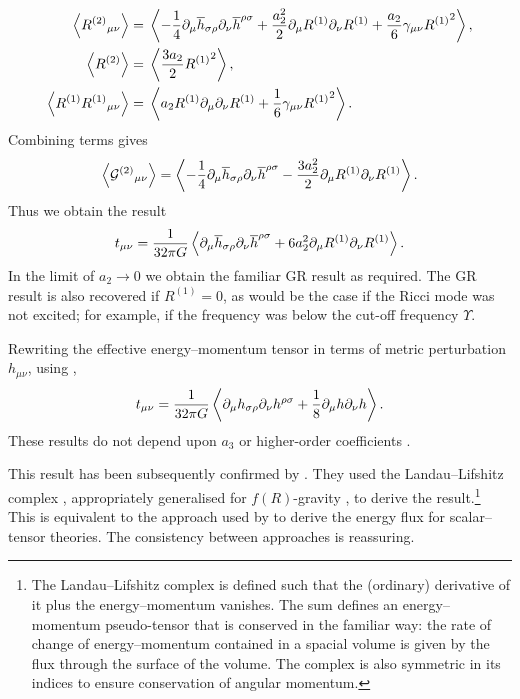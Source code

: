 \begin{subequations}
\begin{align}
\left\langle {R^{(2)}}_{\mu\nu} \right\rangle = {} & \left\langle -\dfrac{1}{4} \partial_\mu\overline{h}_{\sigma\rho}\partial_\nu\overline{h}^{\rho\sigma} + \dfrac{a_2^2}{2}\partial_\mu R^{(1)}\partial_\nu R^{(1)} + \dfrac{a_2}{6}\gamma_{\mu\nu} {R^{(1)}}^2 \right\rangle, \\
\left\langle R^{(2)} \right\rangle = {} & \left\langle \dfrac{3a_2}{2}{R^{(1)}}^2 \right\rangle, \\
\left\langle R^{(1)}{R^{(1)}}_{\mu\nu} \right\rangle = {} & \left\langle a_2 R^{(1)} \partial_\mu\partial_\nu R^{(1)} + \dfrac{1}{6}\gamma_{\mu\nu}{R^{(1)}}^2\right\rangle.
\end{align}
\end{subequations}
Combining terms gives
\begin{equation}
\left\langle {\mathcal{G}^{(2)}}_{\mu\nu}\right\rangle = \left\langle -\dfrac{1}{4} \partial_\mu\overline{h}_{\sigma\rho}\partial_\nu\overline{h}^{\rho\sigma} - \dfrac{3a_2^2}{2}\partial_\mu R^{(1)}\partial_\nu R^{(1)} \right\rangle.
\end{equation}
Thus we obtain the result
\begin{equation}
t_{\mu\nu} = \dfrac{1}{32\pi G}\left\langle \partial_\mu\overline{h}_{\sigma\rho}\partial_\nu\overline{h}^{\rho\sigma} + 6a_2^2\partial_\mu R^{(1)}\partial_\nu R^{(1)} \right\rangle.
\label{eq:Pseudotensor}
\end{equation}
In the limit of $a_2 \rightarrow 0$ we obtain the familiar GR result as required. The GR result is also recovered if $R^{(1)} = 0$, as would be the case if the Ricci mode was not excited; for example, if the frequency was below the cut-off frequency $\Upsilon$.

Rewriting the effective energy--momentum tensor in terms of metric perturbation $h_{\mu\nu}$, using ,
\begin{equation}
t_{\mu\nu} = \dfrac{1}{32\pi G}\left\langle \partial_\mu h_{\sigma\rho}\partial_\nu h^{\rho\sigma} + \dfrac{1}{8}\partial_\mu h \partial_\nu h \right\rangle.
\end{equation}
These results do not depend upon $a_3$ or higher-order coefficients \citep{Stein2011}.

This result has been subsequently confirmed by \citet{Naf2011}. They used the Landau--Lifshitz complex \citep[section 94]{Landau1975}, appropriately generalised for $f(R)$-gravity \citep{Nutku1969}, to derive the result.\footnote{The Landau--Lifshitz complex is defined such that the (ordinary) derivative of it plus the energy--momentum vanishes. The sum defines an energy--momentum pseudo-tensor that is conserved in the familiar way: the rate of change of energy--momentum contained in a spacial volume is given by the flux through the surface of the volume. The complex is also symmetric in its indices to ensure conservation of angular momentum.} This is equivalent to the approach used by \citet[section 10.3]{Will1993} to derive the energy flux for scalar--tensor theories. The consistency between approaches is reassuring.

